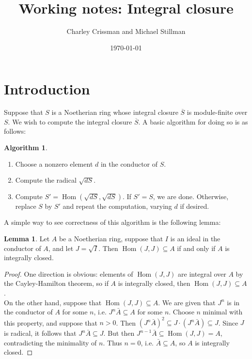 \documentclass{amsart}
\title{Working notes: Integral closure}
\author{Charley Crissman and Michael Stillman}
\date{\today}
\theoremstyle{definition}
\newtheorem{lemma}[theorem]{Lemma}
\newtheorem{algorithm}[theorem]{Algorithm}
\DeclareMathOperator{\Hom}{Hom}
\begin{document}
\maketitle
\setcounter{tocdepth}{1}
\tableofcontents


\section{Introduction}
Suppose that $S$ is a Noetherian ring whose integral closure $\overline{S}$ is module-finite over $S$.  We wish to compute the integral closure $\overline{S}$.  A basic algorithm for doing so is as follows:

\begin{algorithm}\label{alg:basic}
\begin{enumerate}
\item Choose a nonzero element $d$ in the conductor of $S$.
\item Compute the radical $\sqrt{dS}$.
\item Compute $S' = \Hom(\sqrt{dS},\sqrt{dS})$.  If $S' = S$, we are done.  Otherwise, replace $S$ by $S'$ and repeat the computation, varying $d$ if desired. 
\end{enumerate}
\end{algorithm}

A simple way to see correctness of this algorithm is the following lemma:
\begin{lemma}\label{lemma:conductor}
Let $A$ be a Noetherian ring, suppose that $I$ is an ideal in the conductor of $A$, and let $J=\sqrt{I}$.  Then $\Hom(J,J) \subseteq A$ if and only if $A$ is integrally closed.
\end{lemma}
\begin{proof}
One direction is obvious: elements of $\Hom(J,J)$ are integral over $A$ by the Cayley-Hamilton theorem, so if $A$ is integrally closed, then $\Hom(J,J) \subseteq A$.\\
On the other hand, suppose that $\Hom(J,J) \subseteq A$.  We are given that $J^n$ is in the conductor of $A$ for some $n$, i.e. $J^n \bar{A} \subseteq A$ for some $n$.  Choose $n$ minimal with this property, and suppose that $n > 0$.  Then $(J^n\bar{A})^2 \subseteq J \cdot (J^n\bar{A}) \subseteq J$.  Since $J$ is radical, it follows that $J^n\bar{A} \subseteq J$.  But then $J^{n-1}\bar{A} \subseteq \Hom(J,J) = A$, contradicting the minimality of $n$.  Thus $n=0$, i.e. $\bar{A}\subseteq A$, so $A$ is integrally closed.
\end{proof}
\end{document}
